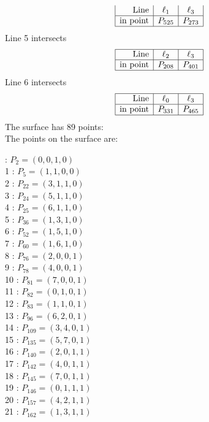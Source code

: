 \documentclass{article}
\begin{document}
{$$\begin{array}{|r*{2}{|c}|}
\mbox{Line}  & \ell_{1} & \ell_{3}\\
\hline
\mbox{in point}  & P_{525} & P_{273}\\
\hline
\end{array}
$$
Line 5 intersects 
$$
\begin{array}{|r*{2}{|c}|}
\hline
\mbox{Line}  & \ell_{2} & \ell_{3}\\
\hline
\mbox{in point}  & P_{208} & P_{401}\\
\hline
\end{array}
$$
Line 6 intersects 
$$
\begin{array}{|r*{2}{|c}|}
\hline
\mbox{Line}  & \ell_{0} & \ell_{3}\\
\hline
\mbox{in point}  & P_{331} & P_{465}\\
\hline
\end{array}
$$
The surface has 89 points:\\
The points on the surface are:\\
\begin{multicols}{3}
 : $P_{2}=( 0, 0, 1, 0 )$\\
1 : $P_{5}=( 1, 1, 0, 0 )$\\
2 : $P_{22}=( 3, 1, 1, 0 )$\\
3 : $P_{24}=( 5, 1, 1, 0 )$\\
4 : $P_{25}=( 6, 1, 1, 0 )$\\
5 : $P_{36}=( 1, 3, 1, 0 )$\\
6 : $P_{52}=( 1, 5, 1, 0 )$\\
7 : $P_{60}=( 1, 6, 1, 0 )$\\
8 : $P_{76}=( 2, 0, 0, 1 )$\\
9 : $P_{78}=( 4, 0, 0, 1 )$\\
10 : $P_{81}=( 7, 0, 0, 1 )$\\
11 : $P_{82}=( 0, 1, 0, 1 )$\\
12 : $P_{83}=( 1, 1, 0, 1 )$\\
13 : $P_{96}=( 6, 2, 0, 1 )$\\
14 : $P_{109}=( 3, 4, 0, 1 )$\\
15 : $P_{135}=( 5, 7, 0, 1 )$\\
16 : $P_{140}=( 2, 0, 1, 1 )$\\
17 : $P_{142}=( 4, 0, 1, 1 )$\\
18 : $P_{145}=( 7, 0, 1, 1 )$\\
19 : $P_{146}=( 0, 1, 1, 1 )$\\
20 : $P_{157}=( 4, 2, 1, 1 )$\\
21 : $P_{162}=( 1, 3, 1, 1 )$\\

\end{multicols}}
\end{document}
